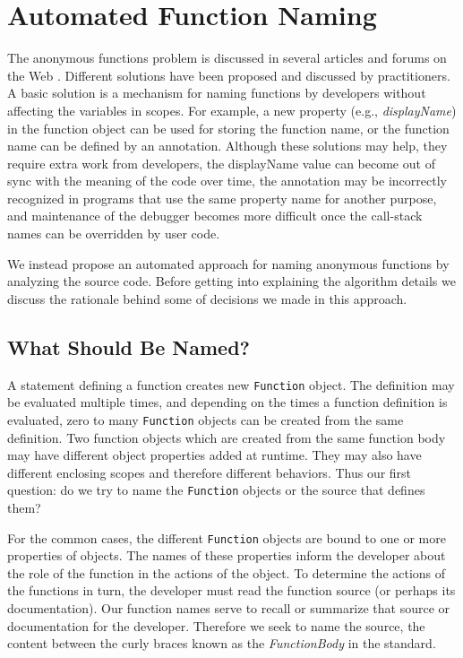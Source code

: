 \documentclass[10pt, preprint]{sigplanconf}
\begin{document}
\section{Automated Function Naming}
The anonymous functions problem is discussed in several articles and forums on the Web \cite{DisplayName, Zaytsev}. Different solutions have been proposed and discussed by practitioners. A basic solution is a mechanism for naming functions by developers without affecting the variables in scopes. For example, a new property (e.g., \textit{displayName}) in the function object can be used for storing the function name, or the function name can be defined by an annotation. Although these solutions may help, they require extra work from developers, the displayName value can become out of sync with the meaning of the code over time,  the annotation may be incorrectly recognized in programs that use the same property name for another purpose, and maintenance of the debugger becomes more difficult once the call-stack names can be overridden by user code.

We instead propose an automated approach for naming anonymous functions by analyzing the source code. Before getting into explaining the algorithm details we discuss the rationale behind some of decisions we made in this approach.

\subsection{What Should Be Named?}


A statement defining a function creates new \verb|Function| 
object.  The definition may be evaluated multiple times, and depending on the times a function definition is evaluated, 
zero to many \verb|Function| objects can be created from the same definition. 
Two function objects which are created from the same function body may have different object properties added at runtime. They may also have different enclosing scopes and therefore different behaviors.  Thus our first 
question: do we try to name the \verb|Function| objects or the source that defines them?

For the common cases, the different \verb|Function| objects are bound to one or more properties of objects. The  names of these properties inform the developer about the role of the function in the actions of the object.  To determine the actions of the functions in turn, the developer must read the function source (or perhaps its documentation). Our function names serve to recall or summarize that source or documentation for the developer. Therefore we seek to name the source, the content between the curly braces known as the {\textit{FunctionBody}} in the standard\cite{ECMA}.
\end{document}
